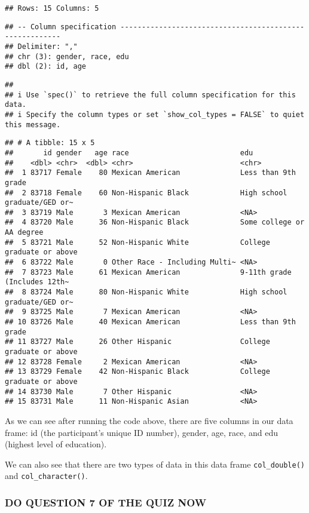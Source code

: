 \documentclass[
]{book}
\begin{document}
\begin{verbatim}
## Rows: 15 Columns: 5
\end{verbatim}

\begin{verbatim}
## -- Column specification --------------------------------------------------------
## Delimiter: ","
## chr (3): gender, race, edu
## dbl (2): id, age
\end{verbatim}

\begin{verbatim}
##
## i Use `spec()` to retrieve the full column specification for this data.
## i Specify the column types or set `show_col_types = FALSE` to quiet this message.
\end{verbatim}

\begin{verbatim}
## # A tibble: 15 x 5
##       id gender   age race                          edu
##    <dbl> <chr>  <dbl> <chr>                         <chr>
##  1 83717 Female    80 Mexican American              Less than 9th grade
##  2 83718 Female    60 Non-Hispanic Black            High school graduate/GED or~
##  3 83719 Male       3 Mexican American              <NA>
##  4 83720 Male      36 Non-Hispanic Black            Some college or AA degree
##  5 83721 Male      52 Non-Hispanic White            College graduate or above
##  6 83722 Male       0 Other Race - Including Multi~ <NA>
##  7 83723 Male      61 Mexican American              9-11th grade (Includes 12th~
##  8 83724 Male      80 Non-Hispanic White            High school graduate/GED or~
##  9 83725 Male       7 Mexican American              <NA>
## 10 83726 Male      40 Mexican American              Less than 9th grade
## 11 83727 Male      26 Other Hispanic                College graduate or above
## 12 83728 Female     2 Mexican American              <NA>
## 13 83729 Female    42 Non-Hispanic Black            College graduate or above
## 14 83730 Male       7 Other Hispanic                <NA>
## 15 83731 Male      11 Non-Hispanic Asian            <NA>
\end{verbatim}

As we can see after running the code above, there are five columns in our data frame: id (the participant's unique ID number), gender, age, race, and edu (highest level of education).

We can also see that there are two types of data in this data frame \texttt{col\_double()} and \texttt{col\_character()}.

\hypertarget{do-question-7-of-the-quiz-now}{%
\subsubsection{DO QUESTION 7 OF THE QUIZ NOW}\label{do-question-7-of-the-quiz-now}}
\end{document}
